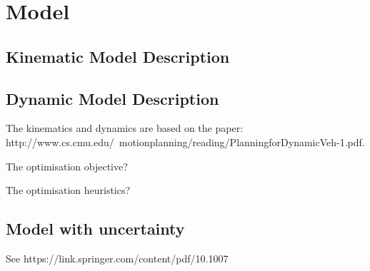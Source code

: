 \chapter{Model}

\section{Kinematic Model Description}

\section{Dynamic Model Description}

The kinematics and dynamics are based on the paper: http://www.cs.cmu.edu/~motionplanning/reading/PlanningforDynamicVeh-1.pdf.

The optimisation objective?

The optimisation heuristics?

\section{Model with uncertainty}

See https://link.springer.com/content/pdf/10.1007%
